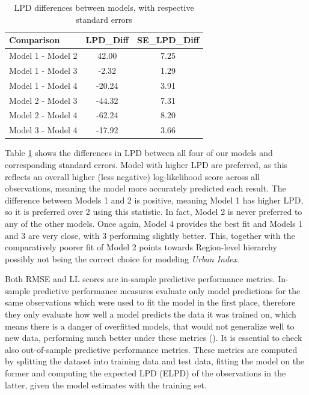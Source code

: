 \documentclass[12pt]{article}
\newcommand{\red}[1]{\textcolor{red}{#1}}
\begin{document}



\begin{table}[ht]
	\centering
	\begin{tabular}{lcc}
		\hline
		       Comparison & LPD\_Diff & SE\_LPD\_Diff \\ 
		       \midrule
		Model 1 - Model 2 &     42.00 &          7.25 \\
		Model 1 - Model 3 &     -2.32 &          1.29 \\
		Model 1 - Model 4 &    -20.24 &          3.91 \\
		Model 2 - Model 3 &    -44.32 &          7.31 \\
		Model 2 - Model 4 &    -62.24 &          8.20 \\
		Model 3 - Model 4 &    -17.92 &          3.66 \\ \hline
	\end{tabular}
	\caption{LPD differences between models, with respective standard errors}
	\label{tab:LPD_diff}
\end{table}

Table \ref{tab:LPD_diff} shows the differences in LPD between all four of our models and corresponding standard errors.
Model with higher LPD are preferred, as this reflects an overall higher (less negative) log-likelihood score across all observations, meaning the model more accurately predicted each result.
The difference between Models 1 and 2 is positive, meaning Model 1 has higher LPD, so it is preferred over 2 using this statistic. In fact, Model 2 is never preferred to any of the other models. Once again, Model 4 provides the best fit and Models 1 and 3 are very close, with 3 performing slightly better. This, together with the comparatively poorer fit of Model 2 points towards Region-level hierarchy possibly not being the correct choice for modeling \textit{Urban Index}.



Both RMSE and LL scores are in-sample predictive performance metrics. In-sample predictive performance measures evaluate only model predictions for the same observations which were used to fit the model in the first place, therefore they only evaluate how well a model predicts the data it was trained on, which means there is a danger of overfitted models, that would not generalize well to new data, performing much better under these metrics (\cite{brmsbook}).
It is essential to check also out-of-sample predictive performance metrics. These metrics are computed by splitting the dataset into training data and test data, fitting the model on the former and computing the expected LPD (ELPD) of the observations in the latter, given the model estimates with the training set. 
\end{document}
